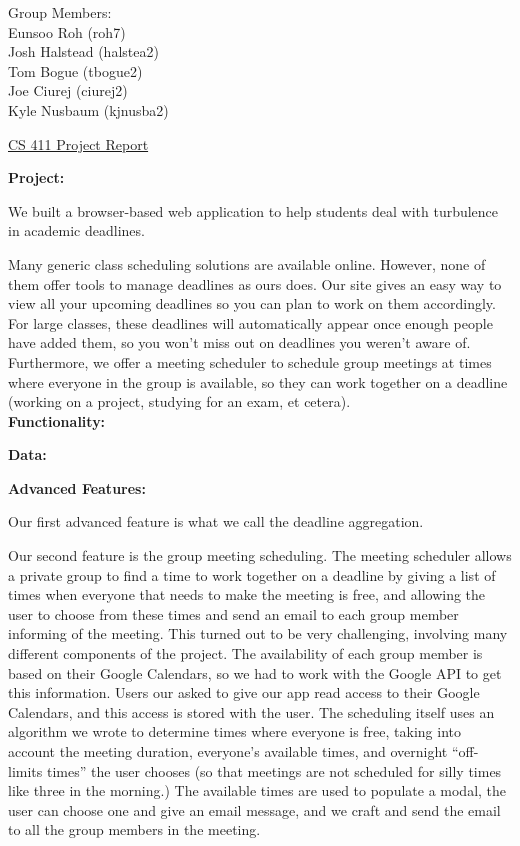 \documentclass{article}
\begin{document}
\begin{flushright}
Group Members:\\
Eunsoo Roh (roh7)\\
Josh Halstead (halstea2)\\
Tom Bogue (tbogue2)\\
Joe Ciurej (ciurej2)\\
Kyle Nusbaum (kjnusba2)\\
\end{flushright}

\begin{center}
{\LARGE \underline{CS 411 Project Report}}
\end{center}

{\bf Project:}

We built a browser-based web application to help students deal with turbulence in academic deadlines.

Many generic class scheduling solutions are available online. However, none of them offer tools to manage deadlines as ours does. Our site gives an easy way to view all your upcoming deadlines so you can plan to work on them accordingly. For large classes, these deadlines will automatically appear once enough people have added them, so you won't miss out on deadlines you weren't aware of. Furthermore, we offer a meeting scheduler to schedule group meetings at times where everyone in the group is available, so they can work together on a deadline (working on a project, studying for an exam, et cetera).\\

{\bf Functionality:}

{\bf Data:}

{\bf Advanced Features:}

Our first advanced feature is what we call the deadline aggregation.

Our second feature is the group meeting scheduling. The meeting scheduler allows a private group to find a time to work together on a deadline by giving a list of times when everyone that needs to make the meeting is free, and allowing the user to choose from these times and send an email to each group member informing of the meeting. This turned out to be very challenging, involving many different components of the project. The availability of each group member is based on their Google Calendars, so we had to work with the Google API to get this information. Users our asked to give our app read access to their Google Calendars, and this access is stored with the user. The scheduling itself uses an algorithm we wrote to determine times where everyone is free, taking into account the meeting duration, everyone's available times, and overnight ``off-limits times'' the user chooses (so that meetings are not scheduled for silly times like three in the morning.) The available times are used to populate a modal, the user can choose one and give an email message, and we craft and send the email to all the group members in the meeting.\\
\end{document}
